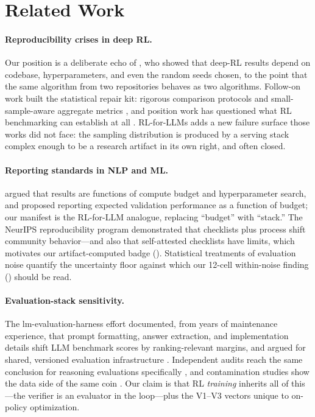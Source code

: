 \section{Related Work}
\label{sec:p5-related}

\paragraph{Reproducibility crises in deep RL.} Our position is a deliberate
echo of \citet{henderson2018deep}, who showed that deep-RL results depend on
codebase, hyperparameters, and even the random seeds chosen, to the point
that the same algorithm from two repositories behaves as two algorithms.
Follow-on work built the statistical repair kit: rigorous comparison
protocols \citep{colas2019hitchhiker} and small-sample-aware aggregate
metrics \citep{agarwal2021deep}, and position work has questioned what RL
benchmarking can establish at all \citep{jordan2024benchmarking}. RL-for-LLMs
adds a new failure surface those works did not face: the sampling
distribution is produced by a serving stack complex enough to be a research
artifact in its own right, and often closed.

\paragraph{Reporting standards in NLP and ML.} \citet{dodge2019show} argued
that results are functions of compute budget and hyperparameter search, and
proposed reporting expected validation performance as a function of budget;
our manifest is the RL-for-LLM analogue, replacing ``budget'' with ``stack.''
The NeurIPS reproducibility program \citep{pineau2020improving} demonstrated
that checklists plus process shift community behavior---and also that
self-attested checklists have limits, which motivates our artifact-computed
badge (). Statistical treatments of evaluation
noise \citep{miller2024erroreval, zhang2024benchvariance} quantify the
uncertainty floor against which our 12-cell within-noise finding
() should be read.

\paragraph{Evaluation-stack sensitivity.} The lm-evaluation-harness effort
documented, from years of maintenance experience, that prompt formatting,
answer extraction, and implementation details shift LLM benchmark scores by
ranking-relevant margins, and argued for shared, versioned evaluation
infrastructure \citep{biderman2024lessons}. Independent audits reach the same
conclusion for reasoning evaluations specifically
\citep{hochlehnert2025sober}, and contamination studies show the data side of
the same coin \citep{zhang2024gsm1k, riddell2024contamination}. Our claim is
that RL \emph{training} inherits all of this---the verifier is an evaluator
in the loop---plus the V1--V3 vectors unique to on-policy optimization.


